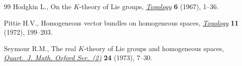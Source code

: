 \documentclass[11pt]{article}
\numberwithin{equation}{section}
\begin{document}
\begin{thebibliography}{99}
Hodgkin L., On the {$K$}-theory of {L}ie groups, \href{http://dx.doi.org/10.1016/0040-9383(67)90010-9}{\textit{Topology}} \textbf{6}
  (1967), 1--36.

Pittie H.V., Homogeneous vector bundles on homogeneous spaces,
  \href{http://dx.doi.org/10.1016/0040-9383(72)90007-9}{\textit{Topology}} \textbf{11} (1972), 199--203.

Seymour R.M., The real {$K$}-theory of {L}ie groups and homogeneous spaces,
  \href{http://dx.doi.org/10.1093/qmath/24.1.7}{\textit{Quart.~J. Math. Oxford Ser.~(2)}} \textbf{24} (1973), 7--30.

\end{thebibliography}
\end{document}
